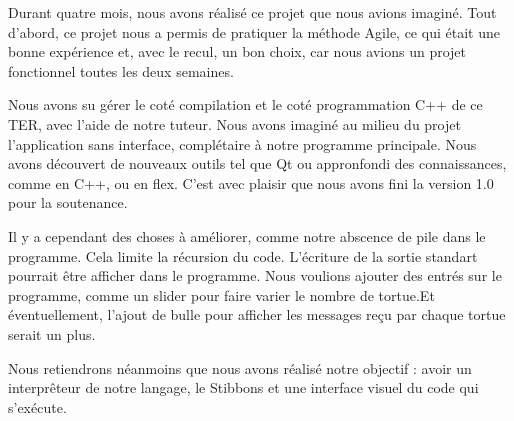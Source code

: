 Durant quatre mois, nous avons réalisé ce projet que nous avions imaginé.
Tout d'abord, ce projet nous a permis de pratiquer la méthode Agile, ce qui était une bonne expérience et, avec le recul, un bon choix, car nous avions un projet fonctionnel toutes les deux semaines.

Nous avons su gérer le coté compilation et le coté programmation C++ de ce TER, avec l'aide de notre tuteur.
Nous avons imaginé au milieu du projet l'application sans interface, complétaire à notre programme principale.
Nous avons découvert de nouveaux outils tel que Qt ou appronfondi des connaissances, comme en C++, ou en flex.
 C'est avec plaisir que nous avons fini la version 1.0 pour la soutenance.

Il y a cependant des choses à améliorer, comme notre abscence de pile dans le programme. Cela limite la récursion du code.
L'écriture de la sortie standart pourrait être afficher dans le programme. Nous voulions ajouter des entrés sur le programme, comme un slider pour faire varier le nombre de tortue.Et éventuellement, l'ajout de bulle pour afficher les messages reçu par chaque tortue serait un plus.

Nous retiendrons néanmoins que nous avons réalisé notre objectif : avoir un interprêteur de notre langage, le Stibbons et une interface visuel du code qui s'exécute.
